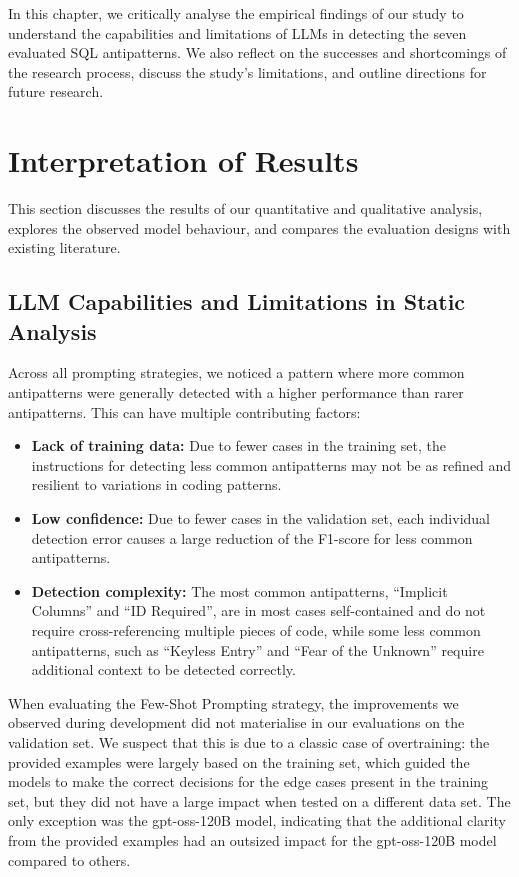 In this chapter, we critically analyse the empirical findings of our study to understand the capabilities and limitations of LLMs in detecting the seven evaluated SQL antipatterns. We also reflect on the successes and shortcomings of the research process, discuss the study's limitations, and outline directions for future research.

\section{Interpretation of Results}\label{sec:interpretation}

This section discusses the results of our quantitative and qualitative analysis, explores the observed model behaviour, and compares the evaluation designs with existing literature.

\subsection{LLM Capabilities and Limitations in Static Analysis}\label{sec:llmCapabilities}

Across all prompting strategies, we noticed a pattern where more common antipatterns were generally detected with a higher performance than rarer antipatterns. This can have multiple contributing factors:
\begin{itemize}
    \item \textbf{Lack of training data:} Due to fewer cases in the training set, the instructions for detecting less common antipatterns may not be as refined and resilient to variations in coding patterns.
    \item \textbf{Low confidence:} Due to fewer cases in the validation set, each individual detection error causes a large reduction of the F1-score for less common antipatterns.
    \item \textbf{Detection complexity:} The most common antipatterns, “Implicit Columns” and “ID Required”, are in most cases self-contained and do not require cross-referencing multiple pieces of code, while some less common antipatterns, such as “Keyless Entry” and “Fear of the Unknown” require additional context to be detected correctly.
\end{itemize}

When evaluating the Few-Shot Prompting strategy, the improvements we observed during development did not materialise in our evaluations on the validation set. We suspect that this is due to a classic case of overtraining: the provided examples were largely based on the training set, which guided the models to make the correct decisions for the edge cases present in the training set, but they did not have a large impact when tested on a different data set. The only exception was the gpt-oss-120B model, indicating that the additional clarity from the provided examples had an outsized impact for the gpt-oss-120B model compared to others.

